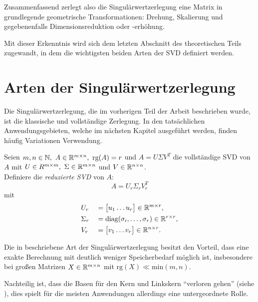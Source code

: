 Zusammenfassend zerlegt also die Singulärwertzerlegung eine Matrix in grundlegende geometrische Transformationen: Drehung, Skalierung und gegebenenfalls Dimensionsreduktion oder -erhöhung.

Mit dieser Erkenntnis wird sich dem letzten Abschnitt des theoretischen Teils zugewandt, in dem die wichtigsten beiden Arten der SVD definiert werden.

\section{Arten der Singulärwertzerlegung}

Die Singulärwertzerlegung, die im vorherigen Teil der Arbeit beschrieben wurde, ist die klassische und vollständige Zerlegung.
In den tatsächlichen Anwendungsgebieten, welche im nächsten Kapitel ausgeführt werden, finden häufig Variationen Verwendung.
\begin{definition}\label{df:redsvd}
    Seien \(m,n \in \N,\ A \in \R^{m \times n},\ \text{rg}(A)=r\) und \(A=U \Sigma V^{T}\) die vollständige SVD von \(A\) mit \(U \in R^{m \times m},\ \Sigma \in \mathbb{R}^{m \times n}\) und \(V \in \mathbb{R}^{n \times n}\). \\
    Definiere die \textit{reduzierte SVD} von \(A\):
    \begin{equation*}
        A = U_r \Sigma_r V^{T}_r
    \end{equation*}
    mit
    \begin{alignat*}{2}
        &U_r &{}={}&
        \big[
        \begin{matrix}
            u_1 \dots u_{r}
        \end{matrix}
        \big]
        \in \mathbb{R}^{m \times r}, \\
        &\Sigma_r &{}={}&
        \text{diag}(\sigma_i,\ldots,\sigma_r)
        \in \mathbb{R}^{r \times r}, \\
        &V_r &{}={}&
        \big[
        \begin{matrix}
            v_1 \dots v_{r}
        \end{matrix}
        \big]
        \in \mathbb{R}^{n \times r}.
    \end{alignat*}
\end{definition}
Die in  beschriebene Art der Singulärwertzerlegung besitzt den Vorteil, dass eine exakte Berechnung mit deutlich weniger Speicherbedarf möglich ist, insbesondere bei großen Matrizen \(X \in \mathbb{R}^{m \times n}\) mit \(\text{rg}(X) \ll \text{min}(m,n)\). 

Nachteilig ist, dass die Basen für den Kern und Linkskern \enquote{verloren gehen} (siehe ), dies spielt für die meisten Anwendungen allerdings eine untergeordnete Rolle.

